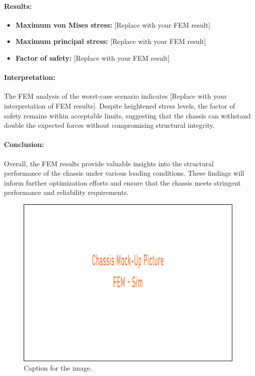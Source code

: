 \paragraph{Results:}
\begin{itemize}
    \item\textbf{Maximum von Mises stress:} [Replace with your FEM result]
    \item\textbf{Maximum principal stress:} [Replace with your FEM result]
    \item\textbf{Factor of safety:} [Replace with your FEM result]
\end{itemize}

\paragraph{Interpretation: }
The FEM analysis of the worst-case scenario indicates [Replace with your interpretation of FEM results]. Despite heightened stress levels, the factor of safety remains within acceptable limits, suggesting that the chassis can withstand double the expected forces without compromising structural integrity.

\paragraph{Conclusion:}
Overall, the FEM results provide valuable insights into the structural performance of the chassis under various loading conditions. These findings will inform further optimization efforts and ensure that the chassis meets stringent performance and reliability requirements.

\begin{figure}[ht]
  \centering
  \includegraphics[width=\linewidth]{texfiles/mech/eimg/chassis/fem1.png}
  \caption{Caption for the image.}
  \label{fig:image1}
\end{figure}

